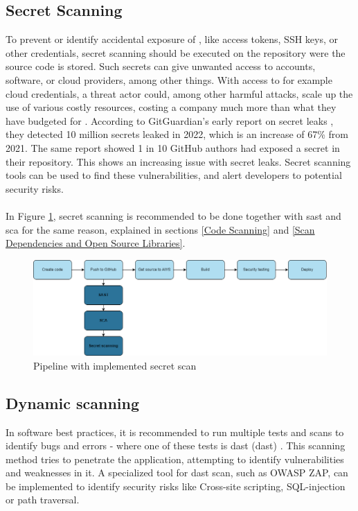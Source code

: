 \subsection{Secret Scanning}
To prevent or identify accidental exposure of , like access tokens, SSH keys, or other credentials, secret scanning should be executed on the repository were the source code is stored. Such secrets can give unwanted access to accounts, software, or cloud providers, among other things. With access to for example cloud credentials, a threat actor could, among other harmful attacks, scale up the use of various costly resources, costing a company much more than what they have budgeted for \cite{GitGuardianexploitexample}. According to GitGuardian's early report on secret leaks \cite{GitGuardiansecretsprawl}, they detected 10 million secrets leaked in 2022, which is an increase of 67\% from 2021. The same report showed 1 in 10 GitHub authors had exposed a secret in their repository. This shows an increasing issue with secret leaks. Secret scanning tools can be used to find these vulnerabilities, and alert developers to potential security risks. \cite{GithubSecretScanning} 
\\~\\
In Figure \ref{fig: Pipeline with implemented secret scan}, secret scanning is recommended to be done together with \acrshort{sast} and \acrshort{sca} for the same reason, explained in sections \ref{Code Scanning} and \ref{Scan Dependencies and Open Source Libraries}.

\vspace{2mm}
\begin{figure}[H]
    \centering
    \includegraphics[width=0.8\columnwidth]{Images/pipeline4.png}
    \caption{Pipeline with implemented secret scan}
    \label{fig: Pipeline with implemented secret scan}
\end{figure}

\subsection{Dynamic scanning}
In software best practices, it is recommended to run multiple tests and scans to identify bugs and errors - where one of these tests is \acrlong{dast} (\acrshort{dast}) \cite{bestpracticeSupplyChain}. This scanning method tries to penetrate the application, attempting to identify vulnerabilities and weaknesses in it. A specialized tool for \acrshort{dast} scan, such as OWASP ZAP, can be implemented to identify security risks like
\gls{Cross-site scripting}, \gls{SQL-injection} or path traversal.\cite{dynamictesting}


